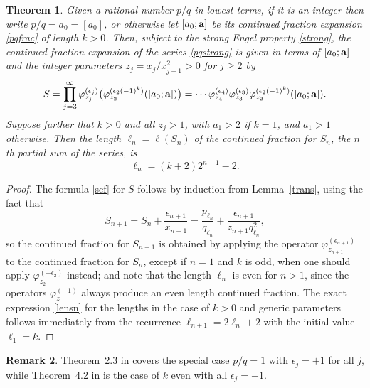 \documentclass[12pt,a4paper]{amsart}
\newtheorem{theorem}{Theorem}[section]
\theoremstyle{definition}
\newtheorem{remark}[theorem]{Remark}
\numberwithin{equation}{section}
\newcommand\eps{{\epsilon}}
\begin{document}
\begin{theorem}
\label{main}
Given a rational number $p/q$ in lowest terms, if it is an integer then write $p/q=a_0=[a_0]$, or otherwise 
let $[a_0; {\bf a}]$ be its continued fraction expansion \eqref{pqfrac} 
of length $k>0$. Then, subject to the strong Engel property 
\eqref{strong}, the continued fraction expansion of the series \eqref{pqstrong} is 
given in terms of $[a_0; {\bf a}]$ and the integer parameters $z_j=x_j/x_{j-1}^2>0$ for $j\geq 2$ by 
\begin{equation}
\label{scf}
S = \prod_{j=3}^\infty \varphi_{z_j}^{(\eps_j)}
\big( \varphi_{z_2}^{(\eps_2(-1)^k)}([a_0; {\bf a}])\big)   
= \cdots  \varphi_{z_4}^{(\eps_4)} \varphi_{z_3}^{(\eps_3)} 
\varphi_{z_2}^{(\eps_2(-1)^k)}([a_0; {\bf a}]) .
\end{equation} 
Suppose further that $k>0$ and all $z_j>1$, with $a_1>2$ if $k=1$, and $a_1>1$ otherwise. %
Then %
the length $\ell_n = \ell(S_n)$ of the continued fraction for $S_n$, the $n$th partial sum of the series, is 
\begin{equation}
\label{lensn}
\ell_n = (k+2)2^{n-1}-2. 
\end{equation} 
\end{theorem} 

\begin{proof} 
The formula \eqref{scf} for $S$ follows by induction from Lemma~\ref{trans}, using the fact 
that 
\[ 
S_{n+1} = S_n + \frac{\eps_{n+1}}{x_{n+1}} = \frac{p_{\ell_n}}{q_{\ell_n}}+
\frac{\eps_{n+1}}
{z_{n+1}q_{\ell_n}^2}, 
\] 
so the continued fraction for $S_{n+1}$ is obtained by applying the operator $\varphi_{z_{n+1}}^{(\eps_{n+1})}$ 
to the continued fraction for $S_{n}$, 
except if $n=1$ and $k$ is odd, when one should apply $\varphi_{z_{2}}^{(-\eps_{2})}$ 
instead; and note that the length $\ell_n$ is even for $n>1$, since the 
operators $\varphi_{z}^{(\pm 1)}$ always produce an even length continued fraction. 
The exact expression \eqref{lensn} for the lengths in the case of $k>0$ and generic parameters 
follows immediately from the recurrence 
$\ell_{n+1} = 2\ell_n +2$ with the initial value $\ell_1=k$. 
\end{proof} 

\begin{remark} 
Theorem~2.3 in \cite{Hone2} covers the special case $p/q=1$ with $\eps_j=+1$ for all $j$, while 
Theorem~4.2 in \cite{HoneVar} is the case of $k$ even with all $\eps_j=+1$.
\end{remark} 
\end{document}
